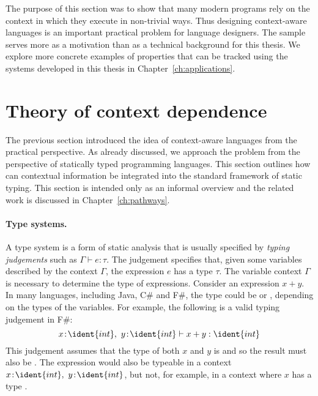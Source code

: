 The purpose of this section was to show that many modern programs rely on the context in which 
they execute in non-trivial ways. Thus designing context-aware languages is an important 
practical problem for language designers. The sample serves more as a motivation than as a 
technical background for this thesis. We explore more concrete examples of properties that 
can be tracked using the systems developed in this thesis in Chapter~\ref{ch:applications}. 


\section{Theory of context dependence}
\label{sec:intro-theory}

The previous section introduced the idea of context-aware languages from the practical perspective.
As already discussed, we approach the problem from the perspective of statically typed programming
languages. This section outlines how can contextual information be integrated into the 
standard framework of static typing. This section is intended only as an informal overview and the
related work is discussed in Chapter~\ref{ch:pathways}.

\paragraph{Type systems.}
A type system is a form of static analysis that is usually specified by \emph{typing judgements}
such as $\Gamma \vdash e : \tau$. The judgement specifies that, given some variables described by
the context $\Gamma$, the expression $e$ has a type $\tau$. 
The variable context $\Gamma$ is necessary to determine the type of expressions. Consider an 
expression $x + y$. In many languages, including Java, C\# and F\#, the type could be 
or , depending on the types of the variables. For example, the following is a valid
typing judgement in F\#:
%
\begin{equation*}
x\!:\!\ident{int},~y\!:\!\ident{int} \vdash x+y : \ident{int}
\end{equation*}
%
This judgement assumes that the type of both $x$ and $y$ is  and so the result must also
be . The expression would also be typeable in a context $x\!:\!\ident{int},~y\!:\!\ident{int}$,
but not, for example, in a context where $x$ has a type .

